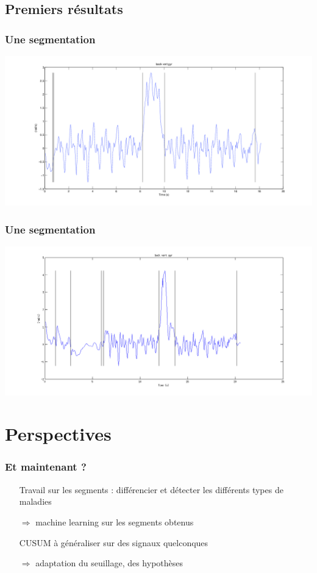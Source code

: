 \documentclass{beamer}
\begin{document}
\subsection{Premiers résultats}

\begin{frame}
	\frametitle{Une segmentation}
	\hspace*{-2.8cm}\includegraphics[scale=0.4]{examplecusumbackvertgyr}
\end{frame}

\begin{frame}
	\frametitle{Une segmentation}
	\hspace*{-2.8cm}\includegraphics[scale=0.4]{errorexamplecusum}
\end{frame}

\section{Perspectives}

\begin{frame}
	\frametitle{Et maintenant ?}
	\begin{itemize}
		\item[Travail] sur les segments : différencier et détecter les différents types de maladies
		\item[$\Longrightarrow$] machine learning sur les segments obtenus
		\vspace*{1cm}
		\item[CUSUM] à généraliser sur des signaux quelconques
		\item[$\Longrightarrow$] adaptation du seuillage, des hypothèses
	\end{itemize}
\end{frame}
\end{document}
